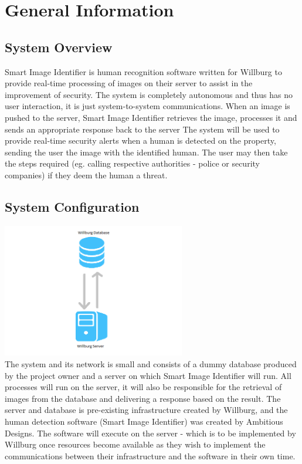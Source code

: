 \documentclass[a4paper,12pt]{report}
\begin{document}
\section{General Information}
\subsection{System Overview}
Smart Image Identifier is human recognition software written for Willburg to provide real-time processing of images on their server to assist in the improvement of security. The system is completely autonomous and thus has no user interaction, it is just system-to-system communications. 
\newline\newline
When an image is pushed to the server, Smart Image Identifier retrieves the image, processes it and sends an appropriate response back to the server
\newline\newline
The system will be used to provide real-time security alerts when a human is detected on the property, sending the user the image with the identified human. The user may then take the steps required (eg. calling respective authorities - police or security companies) if they deem the human a threat.

\subsection{System Configuration}
\includegraphics[width=8cm]{System.png}\\
 The system and its network is small and consists of a dummy database produced by the project owner and a server on which Smart Image Identifier will run. \linebreak
 All processes will run on the server, it will also be responsible for the retrieval of images from the database and delivering a response based on the result.
 \linebreak \linebreak
 The server and database is pre-existing infrastructure created by Willburg, and the human detection software (Smart Image Identifier) was created by Ambitious Designs. The software will execute on the server - which is to be implemented by Willburg once resources become available as they wish to implement the communications between their infrastructure and the software in their own time.
 
\end{document}

